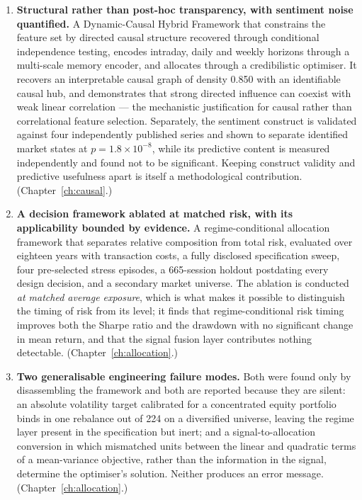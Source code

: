 \begin{enumerate}[label=\textbf{C\arabic*.},leftmargin=2.8em]
\item \textbf{Structural rather than post-hoc transparency, with sentiment noise quantified.}
A Dynamic-Causal Hybrid Framework that constrains the feature set by directed causal structure
recovered through conditional independence testing, encodes intraday, daily and weekly
horizons through a multi-scale memory encoder, and allocates through a credibilistic
optimiser. It recovers an interpretable causal graph of density 0.850 with an identifiable
causal hub, and demonstrates that strong directed influence can coexist with weak linear
correlation --- the mechanistic justification for causal rather than correlational feature
selection. Separately, the sentiment construct is validated against four independently
published series and shown to separate identified market states at $p = 1.8 \times 10^{-8}$,
while its predictive content is measured independently and found not to be significant.
Keeping construct validity and predictive usefulness apart is itself a methodological
contribution. (Chapter~\ref{ch:causal}.)

\item \textbf{A decision framework ablated at matched risk, with its applicability bounded by
evidence.} A regime-conditional allocation framework that separates relative composition from
total risk, evaluated over eighteen years with transaction costs, a fully disclosed
specification sweep, four pre-selected stress episodes, a 665-session holdout postdating every
design decision, and a secondary market universe. The ablation is conducted \emph{at matched
average exposure}, which is what makes it possible to distinguish the timing of risk from its
level; it finds that regime-conditional risk timing improves both the Sharpe ratio and the
drawdown with no significant change in mean return, and that the signal fusion layer
contributes nothing detectable. (Chapter~\ref{ch:allocation}.)

\item \textbf{Two generalisable engineering failure modes.} Both were found only by
disassembling the framework and both are reported because they are silent: an absolute
volatility target calibrated for a concentrated equity portfolio binds in one rebalance out of
224 on a diversified universe, leaving the regime layer present in the specification but
inert; and a signal-to-allocation conversion in which mismatched units between the linear and
quadratic terms of a mean-variance objective, rather than the information in the signal,
determine the optimiser's solution. Neither produces an error message.
(Chapter~\ref{ch:allocation}.)
\end{enumerate}

